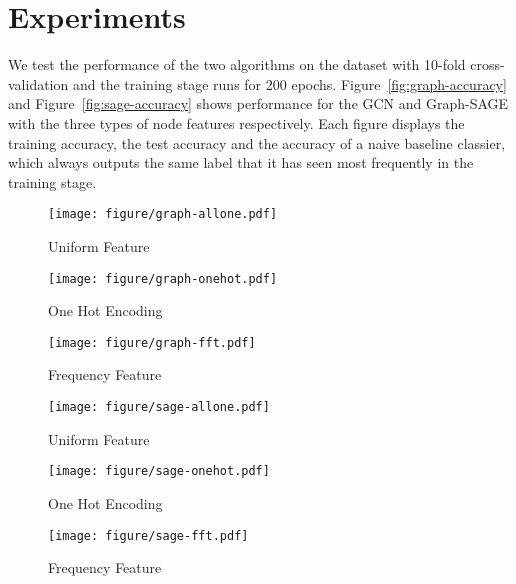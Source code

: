 \documentclass{article}
\begin{document}
\section{Experiments}
We test the performance of the two algorithms on the dataset with 10-fold cross-validation and the training stage runs for 200 epochs. Figure~\ref{fig:graph-accuracy} and Figure~\ref{fig:sage-accuracy} shows performance for the GCN and Graph-SAGE with the three types of node features respectively. Each figure displays the training accuracy, the test accuracy and the accuracy of a naive baseline classier, which always outputs the same label that it has seen most frequently in the training stage.
\begin{figure*}[h]
\centering
    \begin{subfigure}{.33\linewidth}
        \centering
        \texttt{[image: figure/graph-allone.pdf]}
        \caption{Uniform Feature}
        \label{fig:graph-allone}
    \end{subfigure}
    \hspace{-5pt}
    \begin{subfigure}{.33\linewidth}
        \centering
        \texttt{[image: figure/graph-onehot.pdf]}
        \caption{One Hot Encoding}
        \label{fig:graph-onehot}
    \end{subfigure}
    \hspace{-5pt}
    \begin{subfigure}{.33\linewidth}
        \centering
        \texttt{[image: figure/graph-fft.pdf]}
        \caption{Frequency Feature}
        \label{fig:graph-fft}
    \end{subfigure}
    \caption{GCN Performance}
    \label{fig:graph-accuracy}
\end{figure*}

\begin{figure*}[h]
\centering
    \begin{subfigure}{.33\linewidth}
        \centering
        \texttt{[image: figure/sage-allone.pdf]}
        \caption{Uniform Feature}
        \label{fig:sage-allone}
    \end{subfigure}
    \hspace{-5pt}
    \begin{subfigure}{.33\linewidth}
        \centering
        \texttt{[image: figure/sage-onehot.pdf]}
        \caption{One Hot Encoding}
        \label{fig:sage-onehot}
    \end{subfigure}
    \hspace{-5pt}
    \begin{subfigure}{.33\linewidth}
        \centering
        \texttt{[image: figure/sage-fft.pdf]}
        \caption{Frequency Feature}
        \label{fig:sage-fft}
    \end{subfigure}
    \caption{Graph-SAGE Performance}
    \label{fig:sage-accuracy}
\end{figure*}
\end{document}
